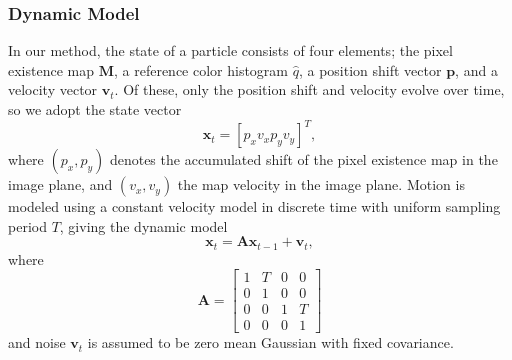 \subsubsection{Dynamic Model}
In our method, the state of a particle consists of four elements; the pixel existence map $\mathbf{M}$, a reference color histogram $\hat{q}$, a position shift vector $\mathbf{p}$, and a velocity vector $\mathbf{v}_t$. Of these, only the position shift and velocity evolve over time, so we adopt the state vector
 \begin{equation} 
 \mathbf{x}_t = [p_x v_x p_y v_y]^T ,
 \end{equation}
where $(p_x,p_y)$ denotes the accumulated shift of the pixel existence map in the image plane, and $(v_x,v_y)$ the map velocity in the image plane. Motion is modeled using a constant velocity model in discrete time with uniform sampling period $\mathit{T}$, giving the dynamic model
\begin{equation} \mathbf{x}_t = \mathbf{A}\mathbf{x}_{t-1} + \mathbf{v}_t , \end{equation}
where
\begin{equation} \mathbf{A} = 
\begin{bmatrix}
 1 & \mathit{T} & 0  & 0 \\ 
 0 & 1 & 0 & 0\\ 
 0 & 0 & 1 & \mathit{T}\\ 
 0 & 0 & 0 & 1
\end{bmatrix} \end{equation}
and noise $\mathbf{v}_t$ is assumed to be zero mean Gaussian with fixed covariance.

